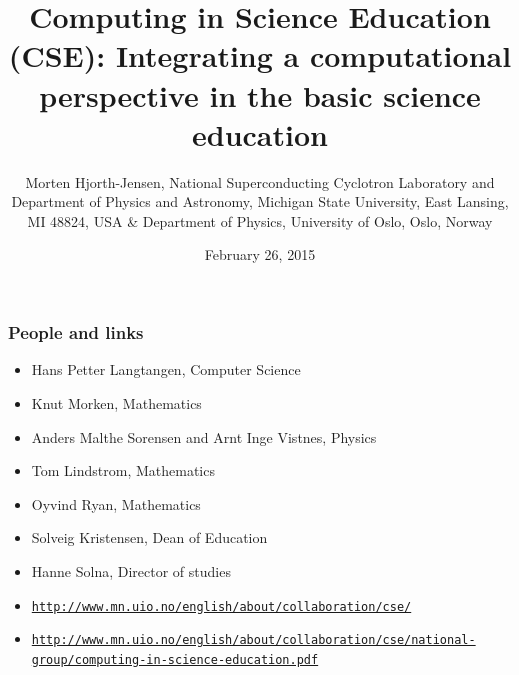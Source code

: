 \documentclass{beamer}
\begin{document}




\title{Computing in Science Education (CSE): Integrating a computational perspective in the basic science education}


\author{Morten Hjorth-Jensen, National Superconducting Cyclotron Laboratory and Department of Physics and Astronomy, Michigan State University, East Lansing, MI 48824, USA {\&} Department of Physics, University of Oslo, Oslo, Norway\inst{}}
\institute{}

\date{February 26, 2015
}

\begin{frame}
\titlepage
\end{frame}

\begin{frame}
\frametitle{People and links}

\begin{block}{}
\begin{itemize}
\item Hans Petter Langtangen, Computer Science

\item Knut Morken, Mathematics

\item Anders Malthe Sorensen and Arnt Inge Vistnes, Physics

\item Tom Lindstrom, Mathematics

\item Oyvind Ryan, Mathematics

\item Solveig Kristensen, Dean of Education

\item Hanne Solna, Director of studies

\item \href{{http://www.mn.uio.no/english/about/collaboration/cse/}}{\nolinkurl{http://www.mn.uio.no/english/about/collaboration/cse/}}

\item \href{{http://www.mn.uio.no/english/about/collaboration/cse/national-group/computing-in-science-education.pdf}}{\nolinkurl{http://www.mn.uio.no/english/about/collaboration/cse/national-group/computing-in-science-education.pdf}}
\end{itemize}

\noindent
\end{block}
\end{frame}
\end{document}
